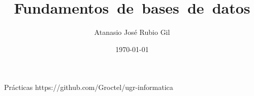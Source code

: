 \documentclass[10pt]{report}
\author{Atanasio José Rubio Gil}
\title{Fundamentos~de~bases~de~datos}
\date{\today}
\begin{document}
            {Prácticas}
            {https://github.com/Groctel/ugr-informatica}
\tableofcontents




\end{document}
